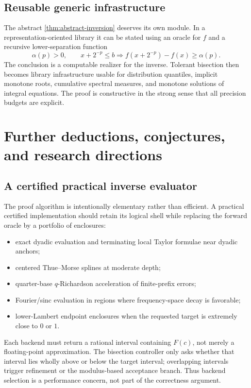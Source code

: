 \documentclass[11pt,oneside]{article}
\theoremstyle{definition}
\theoremstyle{remark}
\numberwithin{equation}{section}
\begin{document}
\subsection{Reusable generic infrastructure}

The abstract \cref{thm:abstract-inversion} deserves its own module.  In a
representation-oriented library it can be stated using an oracle for $f$ and a
recursive lower-separation function
\[
  \alpha(p)>0,
  \qquad x+2^{-p}\le b
  \Longrightarrow f(x+2^{-p})-f(x)\ge\alpha(p).
\]
The conclusion is a computable realizer for the inverse.  Tolerant bisection
then becomes library infrastructure usable for distribution quantiles,
implicit monotone roots, cumulative spectral measures, and monotone solutions
of integral equations.  The proof is constructive in the strong sense that
all precision budgets are explicit.

\section{Further deductions, conjectures, and research directions}
\label{sec:frontiers}

\subsection{A certified practical inverse evaluator}

The proof algorithm is intentionally elementary rather than efficient.  A
practical certified implementation should retain its logical shell while
replacing the forward oracle by a portfolio of enclosures:

\begin{itemize}
\item exact dyadic evaluation and terminating local Taylor formulae near
      dyadic anchors;
\item centered Thue--Morse splines at moderate depth;
\item quarter-base $q$-Richardson acceleration of finite-prefix errors;
\item Fourier/sinc evaluation in regions where frequency-space decay is
      favorable;
\item lower-Lambert endpoint enclosures when the requested target is extremely
      close to $0$ or $1$.
\end{itemize}

Each backend must return a rational interval containing $F(c)$, not merely a
floating-point approximation.  The bisection controller only asks whether
that interval lies wholly above or below the target interval; overlapping
intervals trigger refinement or the modulus-based acceptance branch.  Thus
backend selection is a performance concern, not part of the correctness
argument.
\end{document}
